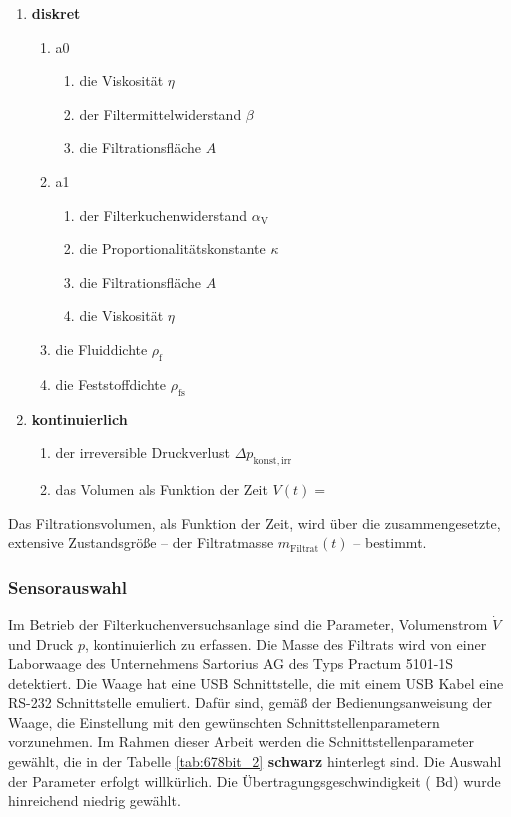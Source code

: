 \begin{enumerate}[label = \textbullet, itemsep = -.1em]
\item \textbf{diskret}
	\begin{enumerate}[label = --, itemsep = -.1em]
	\item a0
			\begin{enumerate}[label = -, itemsep = -.1em]
			\item die Viskosität $\eta$
			\item der Filtermittelwiderstand $\beta$
			\item die Filtrationsfläche $A$
			\end{enumerate}
	\item a1
		\begin{enumerate}[label = -, itemsep = -.1em]
		\item der Filterkuchenwiderstand $\alpha_\mathrm{V}$
		\item die Proportionalitätskonstante $\kappa$
		\item die Filtrationsfläche $A$
		\item die Viskosität $\eta$
		\end{enumerate}
	\item die Fluiddichte $\rho_\mathrm{f}$
	\item die Feststoffdichte $\rho_\mathrm{fs}$
	\end{enumerate}
	
\item \textbf{kontinuierlich}
	\begin{enumerate}[label = --, itemsep = -.1em]
	\item der irreversible Druckverlust $\Delta p_{\mathrm{konst,irr}}$
	\item das Volumen als Funktion der Zeit $V(t)=$\,
	\end{enumerate}

\end{enumerate}

Das Filtrationsvolumen, als Funktion der Zeit, wird über die zusammengesetzte, extensive Zustandsgröße -- der Filtratmasse $m_{\mathrm{Filtrat}}(t)$ -- bestimmt. 

\subsubsection{Sensorauswahl}

  

Im Betrieb der Filterkuchenversuchsanlage sind die Parameter, Volumenstrom $\dot{V}$ und Druck $p$, kontinuierlich zu erfassen. Die Masse des Filtrats wird von einer Laborwaage des Unternehmens Sartorius AG des Typs Practum 5101-1S detektiert. Die Waage hat eine USB Schnittstelle, die mit einem USB Kabel eine RS-232 Schnittstelle emuliert. Dafür sind, gemäß der Bedienungsanweisung der Waage, die Einstellung mit den gewünschten Schnittstellenparametern vorzunehmen. Im Rahmen dieser Arbeit werden die Schnittstellenparameter gewählt, die in der Tabelle \ref{tab:678bit_2} \textbf{schwarz} hinterlegt sind. Die Auswahl der Parameter erfolgt willkürlich. Die Übertragungsgeschwindigkeit ({ Bd}) wurde hinreichend niedrig gewählt.\\

